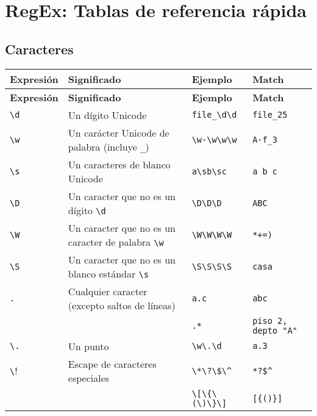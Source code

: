 \documentclass[a4paper, 10pt]{article}
\begin{document}
\section*{RegEx: Tablas de referencia rápida}

\subsection*{Caracteres}

\begin{longtable}{@{} p{2cm} p{7.5cm} p{3cm} p{5cm} @{}}
\toprule
\textbf{Expresión} & \textbf{Significado} & \textbf{Ejemplo} & \textbf{Match} \\
\midrule
\endfirsthead
\toprule
\textbf{Expresión} & \textbf{Significado} & \textbf{Ejemplo} & \textbf{Match} \\
\midrule
\endhead
\bottomrule
\endfoot
\bottomrule
\endlastfoot

\centering \verb!\d! & Un dígito Unicode                                      & \verb!file_\d\d!    & \verb!file_25!           \\
\centering \verb!\w! & Un carácter Unicode de palabra (incluye \verb!_!)      & \verb!\w-\w\w\w!    & \verb!A-f_3!             \\
\centering \verb!\s! & Un caracteres de blanco Unicode                        & \verb!a\sb\sc!      & \verb!a b c!             \\
\centering \verb!\D! & Un caracter que no es un dígito \verb!\d!              & \verb!\D\D\D!       & \verb!ABC!               \\
\centering \verb!\W! & Un caracter que no es un caracter de palabra \verb!\w! & \verb!\W\W\W\W!     & \verb!*+=)!              \\
\centering \verb!\S! & Un caracter que no es un blanco estándar \verb!\s!     & \verb!\S\S\S\S!     & \verb!casa!              \\
\centering \verb!.!  & Cualquier caracter (excepto saltos de líneas)          & \verb!a.c!          & \verb!abc!               \\
                     &                                                        & \verb!.*!           & \verb!piso 2, depto "A"! \\
\centering \verb!\.! & Un punto                                               & \verb!\w\.\d!       & \verb!a.3!               \\
\centering \verb!\!  & Escape de caracteres especiales                        & \verb!\*\?\$\^!     & \verb!*?$^!              \\
                     &                                                        & \verb!\[\{\(\)\}\]! & \verb![{()}]!            \\
\end{longtable}
\end{document}
